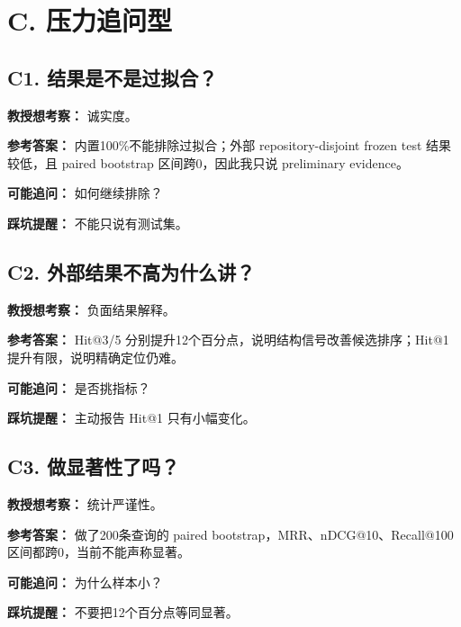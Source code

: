\documentclass[UTF8,12pt,openany]{ctexbook}
\begin{document}
\section{C. 压力追问型}

\subsection{C1. 结果是不是过拟合？}

\textbf{教授想考察：} 诚实度。\par

\textbf{参考答案：} 内置100\%不能排除过拟合；外部 repository-disjoint frozen test 结果较低，且 paired bootstrap 区间跨0，因此我只说 preliminary evidence。\par

\textbf{可能追问：} 如何继续排除？\par

\textbf{踩坑提醒：} 不能只说有测试集。\par

\subsection{C2. 外部结果不高为什么讲？}

\textbf{教授想考察：} 负面结果解释。\par

\textbf{参考答案：} Hit@3/5 分别提升12个百分点，说明结构信号改善候选排序；Hit@1提升有限，说明精确定位仍难。\par

\textbf{可能追问：} 是否挑指标？\par

\textbf{踩坑提醒：} 主动报告 Hit@1 只有小幅变化。\par

\subsection{C3. 做显著性了吗？}

\textbf{教授想考察：} 统计严谨性。\par

\textbf{参考答案：} 做了200条查询的 paired bootstrap，MRR、nDCG@10、Recall@100 区间都跨0，当前不能声称显著。\par

\textbf{可能追问：} 为什么样本小？\par

\textbf{踩坑提醒：} 不要把12个百分点等同显著。\par
\end{document}
